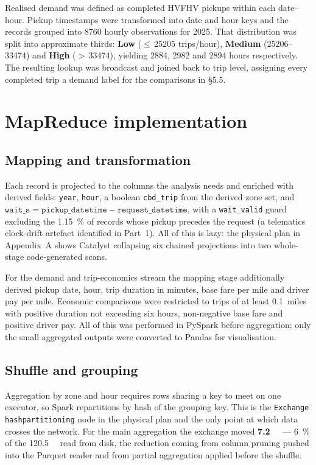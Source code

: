 \documentclass[10pt,a4paper]{article}
\begin{document}
Realised demand was defined as completed HVFHV pickups within each date--hour.
Pickup timestamps were transformed into date and hour keys and the records
grouped into \num{8760} hourly observations for 2025. That distribution was split
into approximate thirds: \textbf{Low} ($\leq$\,\num{25205} trips/hour),
\textbf{Medium} (\num{25206}--\num{33474}) and \textbf{High}
($>$\,\num{33474}), yielding \num{2884}, \num{2982} and \num{2894} hours
respectively. The resulting lookup was broadcast and joined back to trip level,
assigning every completed trip a demand label for the comparisons in \S5.5.

\section{MapReduce implementation}

\subsection{Mapping and transformation}
Each record is projected to the columns the analysis needs and enriched with
derived fields: \texttt{year}, \texttt{hour}, a boolean \texttt{cbd\_trip} from
the derived zone set, and
$\texttt{wait\_s} = \texttt{pickup\_datetime} - \texttt{request\_datetime}$, with
a \texttt{wait\_valid} guard excluding the \SI{1.15}{\percent} of records whose
pickup precedes the request (a telematics clock-drift artefact identified in
Part~1). All of this is lazy: the physical plan in Appendix~A shows Catalyst
collapsing six chained projections into two whole-stage code-generated scans.

For the demand and trip-economics stream the mapping stage additionally derived
pickup date, hour, trip duration in minutes, base fare per mile and driver pay
per mile. Economic comparisons were restricted to trips of at least 0.1~miles
with positive duration not exceeding six hours, non-negative base fare and
positive driver pay. All of this was performed in PySpark before aggregation;
only the small aggregated outputs were converted to Pandas for visualisation.

\subsection{Shuffle and grouping}
Aggregation by zone and hour requires rows sharing a key to meet on one
executor, so Spark repartitions by hash of the grouping key. This is the
\texttt{Exchange hashpartitioning} node in the physical plan and the only point
at which data crosses the network. For the main aggregation the exchange moved
\textbf{\SI{7.2}{\gibi\byte}} --- \SI{6}{\percent} of the \SI{120.5}{\gibi\byte}
read from disk, the reduction coming from column pruning pushed into the Parquet
reader and from partial aggregation applied before the shuffle.
\end{document}
